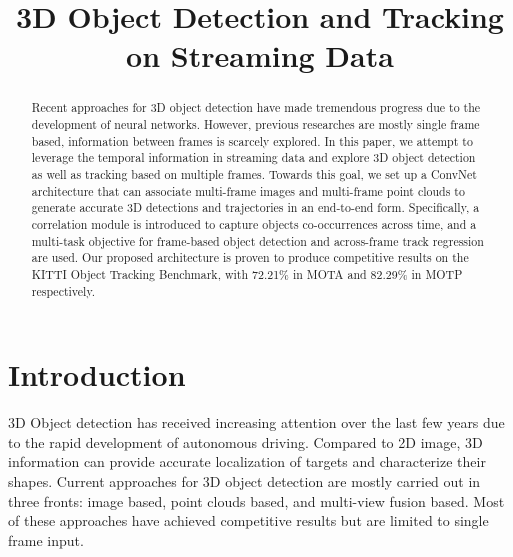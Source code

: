 \documentclass{bmvc2k}
\title{3D Object Detection and Tracking on Streaming Data}
\begin{document}
\maketitle
\begin{abstract}
Recent approaches for 3D object detection have made tremendous progress due to the development of neural networks. However, previous researches are mostly single frame based, information between frames is scarcely explored. In this paper, we attempt to leverage the temporal information in streaming data and explore 3D object detection as well as tracking based on multiple frames. Towards this goal, we set up a ConvNet architecture that can associate multi-frame images and multi-frame point clouds to generate accurate 3D detections and trajectories in an end-to-end form. Specifically, a correlation module is introduced to capture objects co-occurrences across time, and a multi-task objective for frame-based object detection and across-frame track regression are used. Our proposed architecture is proven to produce competitive results on the KITTI Object Tracking Benchmark, with 72.21\% in MOTA and 82.29\% in MOTP respectively.
\end{abstract}

\section{Introduction}
\label{sec:intro} 
3D Object detection has received increasing attention over the last few years due to the rapid development of autonomous driving. Compared to 2D image, 3D information can provide accurate localization of targets and characterize their shapes. Current approaches for 3D object detection are mostly carried out in three fronts: image based\cite{7780605, chen20183d}, point clouds based\cite{zhou2018voxelnet,yang2018pixor,simon2018complex}, and multi-view fusion based\cite{chen2017multi,ku2018joint}. Most of these approaches have achieved competitive results but are limited to single frame input.

\end{document}
